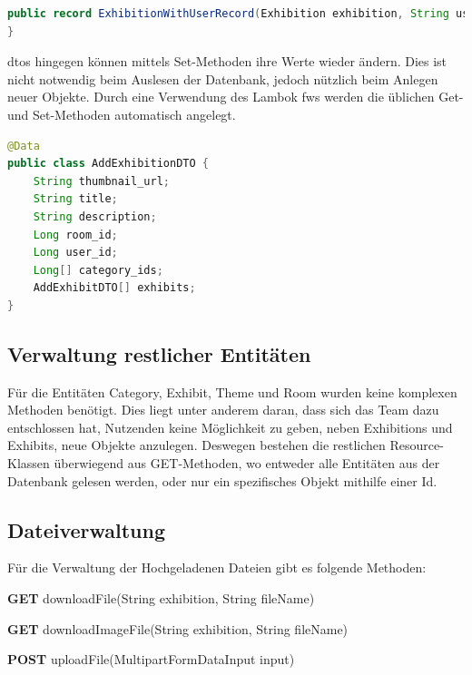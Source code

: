 \begin{lstlisting}[label=lst:exhibitionRecord, language=Java, caption=Verworfener Exhibition Record]
public record ExhibitionWithUserRecord(Exhibition exhibition, String user_name, String user_icon_url) {
}
\end{lstlisting}

\gls{dto}s hingegen können mittels Set-Methoden ihre Werte wieder ändern.
Dies ist nicht notwendig beim Auslesen der Datenbank, jedoch nützlich beim Anlegen neuer Objekte. 
Durch eine Verwendung des Lambok \gls{fw}s werden die üblichen Get- und Set-Methoden automatisch angelegt. 
\cite{Lambok}

\begin{lstlisting}[label=lst:exhibitiondto, language=Java, caption=Exhibition DTO]
@Data
public class AddExhibitionDTO {
    String thumbnail_url;
    String title;
    String description;
    Long room_id;
    Long user_id;
    Long[] category_ids;
    AddExhibitDTO[] exhibits;
}
\end{lstlisting}

\subsection{Verwaltung restlicher Entitäten}

Für die Entitäten Category, Exhibit, Theme und Room wurden keine komplexen Methoden benötigt. 
Dies liegt unter anderem daran, dass sich das Team dazu entschlossen hat, Nutzenden keine Möglichkeit zu geben, neben Exhibitions und Exhibits, neue Objekte anzulegen. 
Deswegen bestehen die restlichen Resource-Klassen überwiegend aus GET-Methoden, wo entweder alle Entitäten aus der Datenbank gelesen werden, oder nur ein spezifisches Objekt mithilfe einer Id. 

\subsection{Dateiverwaltung}
Für die Verwaltung der Hochgeladenen Dateien gibt es folgende Methoden: 
\begin{compactitem}
    \item \textbf{GET} downloadFile(String exhibition, String fileName)
    \item \textbf{GET} downloadImageFile(String exhibition, String fileName)
    \item \textbf{POST} uploadFile(MultipartFormDataInput input)
\end{compactitem}

